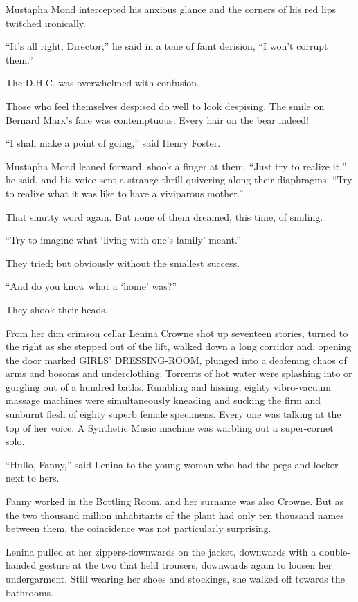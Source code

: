 \documentclass[12pt]{report}
\begin{document}
Mustapha Mond intercepted his anxious glance and the corners of his red
lips twitched ironically.

``It's all right, Director,'' he said in a tone of faint derision, ``I
won't corrupt them.''

The D.H.C. was overwhelmed with confusion.
\\
\par 
Those who feel themselves despised do well to look despising. The smile
on Bernard Marx's face was contemptuous. Every hair on the bear indeed!

``I shall make a point of going,'' said Henry Foster.

Mustapha Mond leaned forward, shook a finger at them. ``Just try to
realize it,'' he said, and his voice sent a strange thrill quivering
along their diaphragms. ``Try to realize what it was like to have a
viviparous mother.''

That smutty word again. But none of them dreamed, this time, of smiling.

``Try to imagine what `living with one's family' meant.''

They tried; but obviously without the smallest success.

``And do you know what a `home' was?''

They shook their heads.

From her dim crimson cellar Lenina Crowne shot up seventeen stories,
turned to the right as she stepped out of the lift, walked down a long
corridor and, opening the door marked {\selectfont GIRLS' DRESSING-ROOM}, plunged into
a deafening chaos of arms and bosoms and underclothing. Torrents of hot
water were splashing into or gurgling out of a hundred baths. Rumbling
and hissing, eighty vibro-vacuum massage machines were simultaneously
kneading and sucking the firm and sunburnt flesh of eighty superb female
specimens. Every one was talking at the top of her voice. A Synthetic
Music machine was warbling out a super-cornet solo.

``Hullo, Fanny,'' said Lenina to the young woman who had the pegs and
locker next to hers.

Fanny worked in the Bottling Room, and her surname was also Crowne. But
as the two thousand million inhabitants of the plant had only ten
thousand names between them, the coincidence was not particularly
surprising.

Lenina pulled at her zippers-downwards on the jacket, downwards with a
double-handed gesture at the two that held trousers, downwards again to
loosen her undergarment. Still wearing her shoes and stockings, she
walked off towards the bathrooms.
\end{document}
